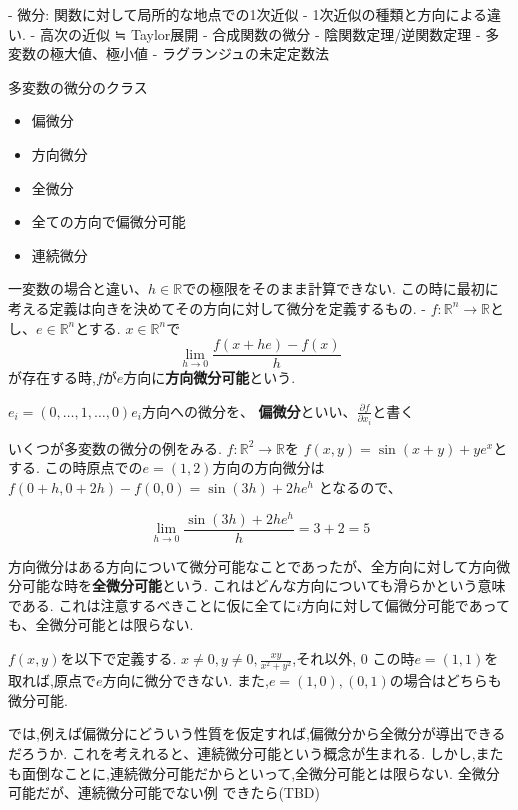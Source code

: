 \documentclass{ujarticle}
\begin{document}
- 微分: 関数に対して局所的な地点での1次近似
- 1次近似の種類と方向による違い.
- 高次の近似 ≒ Taylor展開
- 合成関数の微分
- 陰関数定理/逆関数定理
- 多変数の極大値、極小値
  - ラグランジュの未定定数法

多変数の微分のクラス
\begin{itemize}
\item 偏微分
\item 方向微分
\item 全微分
\item 全ての方向で偏微分可能
\item 連続微分
\end{itemize}

一変数の場合と違い、$h \in \mathbb{R}$での極限をそのまま計算できない.
この時に最初に考える定義は向きを決めてその方向に対して微分を定義するもの.
- $f:\mathbb{R}^n \to \mathbb{R}$とし、$e \in \mathbb{R}^n$とする.
$x \in \mathbb{R}^n$で
\begin{equation*}
  \lim_{h\to0}\frac{f(x + he) - f(x)}{h}
\end{equation*}
が存在する時,$f$が$e$方向に\textbf{方向微分可能}という.

$e_i = (0, \ldots, 1, \ldots, 0)$$e_i$方向への微分を、 \textbf{偏微分}といい、$\frac{\partial f}{\partial x_i}$と書く

いくつが多変数の微分の例をみる.
$f: \mathbb{R}^2 \to \mathbb{R}$を
$f(x, y) = \sin(x+y) + ye^x$とする.
この時原点での$e = (1 ,2)$方向の方向微分は
$f(0+h, 0+2h) - f(0, 0) = \sin(3h) + 2he^h$
となるので、

$$
\lim_{h \to 0} \frac{\sin(3h) + 2he^h }{h} = 3 + 2 = 5
$$

方向微分はある方向について微分可能なことであったが、全方向に対して方向微分可能な時を\textbf{全微分可能}という.
これはどんな方向についても滑らかという意味である.
これは注意するべきことに仮に全てに$i$方向に対して偏微分可能であっても、全微分可能とは限らない.


\begin{epl}
$f(x, y)$を以下で定義する.
$x \neq 0, y \neq 0,\frac{xy}{x^2 + y^2}$,それ以外, 0
この時$e = (1, 1)$を取れば,原点で$e$方向に微分できない.
また,$e = (1, 0), (0, 1)$の場合はどちらも微分可能.
\end{epl}

では,例えば偏微分にどういう性質を仮定すれば,偏微分から全微分が導出できるだろうか.
これを考えれると、連続微分可能という概念が生まれる.
しかし,またも面倒なことに,連続微分可能だからといって,全微分可能とは限らない.
全微分可能だが、連続微分可能でない例
できたら(TBD)
\end{document}
